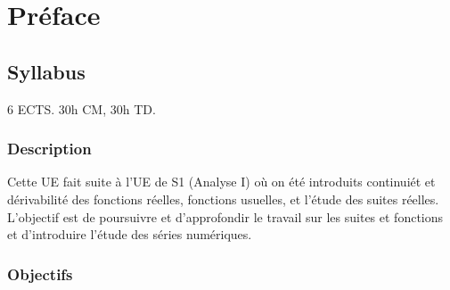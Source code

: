 
\chapter*{Préface}


\section*{Syllabus}

6 ECTS. 30h CM, 30h TD.

\subsection*{Description}

Cette UE fait suite à l'UE de S1 (Analyse I) où on été introduits continuiét et dérivabilité des fonctions réelles, fonctions usuelles, et l'étude des suites réelles.
L'objectif est de poursuivre et d'approfondir le travail sur les suites et fonctions et d'introduire l'étude des séries numériques.

\subsection*{Objectifs}

